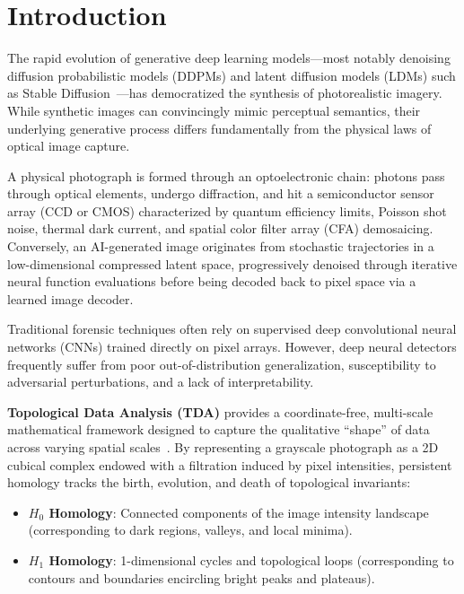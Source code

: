 \documentclass[11pt,a4paper]{article}
\begin{document}
\section{Introduction}

The rapid evolution of generative deep learning models—most notably denoising diffusion probabilistic models (DDPMs) and latent diffusion models (LDMs) such as Stable Diffusion~\cite{rombach2022high}—has democratized the synthesis of photorealistic imagery. While synthetic images can convincingly mimic perceptual semantics, their underlying generative process differs fundamentally from the physical laws of optical image capture. 

A physical photograph is formed through an optoelectronic chain: photons pass through optical elements, undergo diffraction, and hit a semiconductor sensor array (CCD or CMOS) characterized by quantum efficiency limits, Poisson shot noise, thermal dark current, and spatial color filter array (CFA) demosaicing. Conversely, an AI-generated image originates from stochastic trajectories in a low-dimensional compressed latent space, progressively denoised through iterative neural function evaluations before being decoded back to pixel space via a learned image decoder.

Traditional forensic techniques often rely on supervised deep convolutional neural networks (CNNs) trained directly on pixel arrays. However, deep neural detectors frequently suffer from poor out-of-distribution generalization, susceptibility to adversarial perturbations, and a lack of interpretability. 

\textbf{Topological Data Analysis (TDA)} provides a coordinate-free, multi-scale mathematical framework designed to capture the qualitative ``shape'' of data across varying spatial scales~\cite{edelsbrunner2000topological,kaczynski2004computational}. By representing a grayscale photograph as a 2D cubical complex endowed with a filtration induced by pixel intensities, persistent homology tracks the birth, evolution, and death of topological invariants:
\begin{itemize}[noitemsep]
    \item \textbf{$H_0$ Homology}: Connected components of the image intensity landscape (corresponding to dark regions, valleys, and local minima).
    \item \textbf{$H_1$ Homology}: 1-dimensional cycles and topological loops (corresponding to contours and boundaries encircling bright peaks and plateaus).
\end{itemize}
\end{document}
